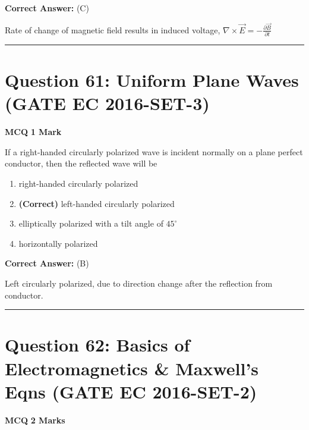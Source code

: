 \documentclass[11pt,a4paper]{article}
\begin{document}
\noindent \textbf{Correct Answer:} (C)

\begin{tcolorbox}[solbox, title=Detailed Solution -- Question 60]
Rate of change of magnetic field results in induced voltage, 
$\nabla \times \vec{E}=-\frac{\partial \vec{B}}{\partial t}$
\end{tcolorbox}

\vspace{1.5em}
\hrule
\vspace{1.5em}

\section*{Question 61: Uniform Plane Waves (GATE EC 2016-SET-3)}
\noindent \textbf{\color{primary}MCQ} \hfill \textbf{\color{secondary}1 Mark}


\noindent If a right-handed circularly polarized wave is incident normally on a plane perfect conductor, then the reflected wave will be


\begin{enumerate}[label=(\Alph*)]
    \item right-handed circularly polarized
    \item \textbf{(Correct)} left-handed circularly polarized
    \item elliptically polarized with a tilt angle of $45^{\circ}$
    \item horizontally polarized
\end{enumerate}

\noindent \textbf{Correct Answer:} (B)

\begin{tcolorbox}[solbox, title=Detailed Solution -- Question 61]
Left circularly polarized, due to direction change
after the reflection from conductor.
\end{tcolorbox}

\vspace{1.5em}
\hrule
\vspace{1.5em}

\section*{Question 62: Basics of Electromagnetics \& Maxwell's Eqns (GATE EC 2016-SET-2)}
\noindent \textbf{\color{primary}MCQ} \hfill \textbf{\color{secondary}2 Marks}
\end{document}
